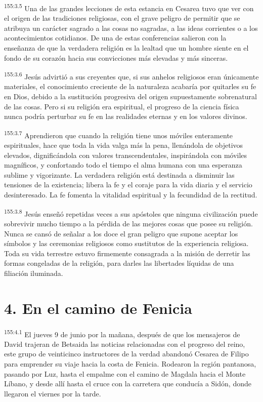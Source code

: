 \par
\textsuperscript{155:3.5} Una de las grandes lecciones de esta estancia en Cesarea tuvo que ver con el origen de las tradiciones religiosas, con el grave peligro de permitir que se atribuya un carácter sagrado a las cosas no sagradas, a las ideas corrientes o a los acontecimientos cotidianos. De una de estas conferencias salieron con la enseñanza de que la verdadera religión es la lealtad que un hombre siente en el fondo de su corazón hacia sus convicciones más elevadas y más sinceras.

\par
\textsuperscript{155:3.6} Jesús advirtió a sus creyentes que, si sus anhelos religiosos eran únicamente materiales, el conocimiento creciente de la naturaleza acabaría por quitarles su fe en Dios, debido a la sustitución progresiva del origen supuestamente sobrenatural de las cosas. Pero si su religión era espiritual, el progreso de la ciencia física nunca podría perturbar su fe en las realidades eternas y en los valores divinos.

\par
\textsuperscript{155:3.7} Aprendieron que cuando la religión tiene unos móviles enteramente espirituales, hace que toda la vida valga más la pena, llenándola de objetivos elevados, dignificándola con valores transcendentales, inspirándola con móviles magníficos, y confortando todo el tiempo el alma humana con una esperanza sublime y vigorizante. La verdadera religión está destinada a disminuir las tensiones de la existencia; libera la fe y el coraje para la vida diaria y el servicio desinteresado. La fe fomenta la vitalidad espiritual y la fecundidad de la rectitud.

\par
\textsuperscript{155:3.8} Jesús enseñó repetidas veces a sus apóstoles que ninguna civilización puede sobrevivir mucho tiempo a la pérdida de las mejores cosas que posee su religión. Nunca se cansó de señalar a los doce el gran peligro que supone aceptar los símbolos y las ceremonias religiosos como sustitutos de la experiencia religiosa. Toda su vida terrestre estuvo firmemente consagrada a la misión de derretir las formas congeladas de la religión, para darles las libertades líquidas de una filiación iluminada.

\section*{4. En el camino de Fenicia}
\par
\textsuperscript{155:4.1} El jueves 9 de junio por la mañana, después de que los mensajeros de David trajeran de Betsaida las noticias relacionadas con el progreso del reino, este grupo de veinticinco instructores de la verdad abandonó Cesarea de Filipo para emprender su viaje hacia la costa de Fenicia. Rodearon la región pantanosa, pasando por Luz, hasta el empalme con el camino de Magdala hacia el Monte Líbano, y desde allí hasta el cruce con la carretera que conducía a Sidón, donde llegaron el viernes por la tarde.

